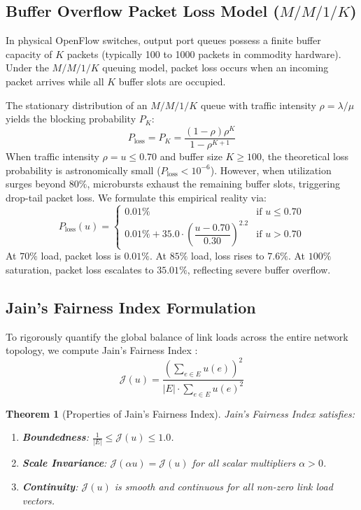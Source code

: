 \documentclass[12pt,a4paper,oneside]{report}
\newtheorem{theorem}{Theorem}[chapter]
\begin{document}
\subsection{Buffer Overflow Packet Loss Model ($M/M/1/K$)}
In physical OpenFlow switches, output port queues possess a finite buffer capacity of $K$ packets (typically 100 to 1000 packets in commodity hardware). Under the $M/M/1/K$ queuing model, packet loss occurs when an incoming packet arrives while all $K$ buffer slots are occupied.

The stationary distribution of an $M/M/1/K$ queue with traffic intensity $\rho = \lambda / \mu$ yields the blocking probability $P_K$:
\begin{equation}
    P_{\text{loss}} = P_K = \frac{(1 - \rho)\rho^K}{1 - \rho^{K+1}}
\end{equation}
When traffic intensity $\rho = u \le 0.70$ and buffer size $K \ge 100$, the theoretical loss probability is astronomically small ($P_{\text{loss}} < 10^{-6}$). However, when utilization surges beyond $80\%$, microbursts exhaust the remaining buffer slots, triggering drop-tail packet loss. We formulate this empirical reality via:
\begin{equation}
    P_{\text{loss}}(u) = \begin{cases}
        0.01\% & \text{if } u \le 0.70 \\[0.5em]
        0.01\% + 35.0 \cdot \left( \dfrac{u - 0.70}{0.30} \right)^{2.2} & \text{if } u > 0.70
    \end{cases}
    \label{eq:packet_loss_model}
\end{equation}
At $70\%$ load, packet loss is $0.01\%$. At $85\%$ load, loss rises to $7.6\%$. At $100\%$ saturation, packet loss escalates to $35.01\%$, reflecting severe buffer overflow.

\subsection{Jain's Fairness Index Formulation}
To rigorously quantify the global balance of link loads across the entire network topology, we compute Jain's Fairness Index \cite{jain1984quantitative}:
\begin{equation}
    \mathcal{J}(u) = \frac{\left( \sum_{e \in E} u(e) \right)^2}{|E| \cdot \sum_{e \in E} u(e)^2}
    \label{eq:jains_fairness_formula}
\end{equation}

\begin{theorem}[Properties of Jain's Fairness Index]
Jain's Fairness Index satisfies:
\begin{enumerate}
    \item \textbf{Boundedness}: $\frac{1}{|E|} \le \mathcal{J}(u) \le 1.0$.
    \item \textbf{Scale Invariance}: $\mathcal{J}(\alpha u) = \mathcal{J}(u)$ for all scalar multipliers $\alpha > 0$.
    \item \textbf{Continuity}: $\mathcal{J}(u)$ is smooth and continuous for all non-zero link load vectors.
\end{enumerate}
\end{theorem}
\end{document}
